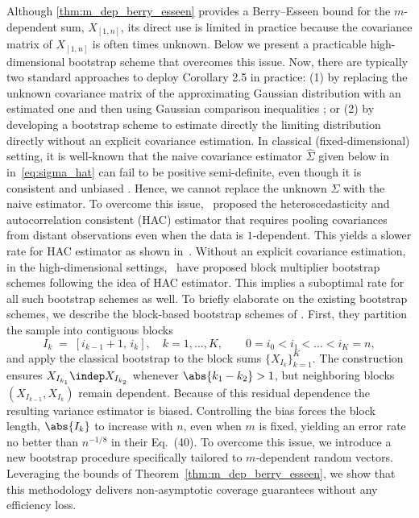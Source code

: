\documentclass[aos]{imsart}
\begin{document}
Although \cref{thm:m_dep_berry_esseen} provides a Berry--Esseen bound for the $m$-dependent sum, $X_{[1,n]}$, its direct use is limited in practice because the covariance matrix of $X_{[1,n]}$ is often times unknown. Below we present a practicable high-dimensional bootstrap scheme that overcomes this issue.
Now, there are typically two standard approaches to deploy Corollary 2.5 in practice: (1) by replacing the unknown covariance matrix of the approximating Gaussian distribution with an estimated one and then using Gaussian comparison inequalities ; or (2) by developing a bootstrap scheme to estimate directly the limiting distribution directly without an explicit covariance estimation. In classical (fixed-dimensional) setting, it is well-known that the naive covariance estimator $\hat{\Sigma}$ given below in in~\eqref{eq:sigma_hat} can fail to be positive semi-definite, even though it is consistent and unbiased \citep{newey1987simple}. Hence, we cannot replace the unknown $\Sigma$ with the naive estimator. To overcome this issue,~\cite{newey1987simple} proposed the heteroscedasticity and autocorrelation consistent (HAC) estimator that requires pooling covariances from distant observations even when the data is $1$-dependent. This yields a slower rate for HAC estimator as shown in~\cite{andrews1991heteroskedasticity,zhang2017gaussian}. Without an explicit covariance estimation, in the high-dimensional settings,~\citep{zhang2014bootstrapping} have proposed block multiplier bootstrap schemes following the idea of HAC estimator. This implies a suboptimal rate for all such bootstrap schemes as well.
%
To briefly elaborate on the existing bootstrap schemes, we describe the block-based bootstrap schemes of \citet{zhang2014bootstrapping}.
First, they partition the sample into contiguous blocks  
\begin{equation*}
  I_k \;=\; [i_{k-1}+1,\,i_k], 
  \quad k=1,\dots,K, 
  \qquad 0=i_0<i_1<\dots<i_K=n,
\end{equation*}
and apply the classical bootstrap to the block sums $\{X_{I_k}\}_{k=1}^K$.  
The construction ensures $X_{I_{k_1}} \indep X_{I_{k_2}}$ whenever $\abs{k_1-k_2} > 1$, but neighboring blocks $(X_{I_{k-1}},X_{I_k})$ remain dependent.  
Because of this residual dependence the resulting variance estimator is biased.  
Controlling the bias forces the block length, $\abs{I_k}$ to increase with $n$, even when $m$ is fixed, yielding an error rate no better than $n^{-1/8}$ in their Eq.~(40).
%
To overcome this issue, we introduce a new bootstrap procedure specifically tailored to $m$‑dependent random vectors.  
Leveraging the bounds of Theorem~\ref{thm:m_dep_berry_esseen}, we show that this methodology delivers non‑asymptotic coverage guarantees without any efficiency loss. %
\end{document}
